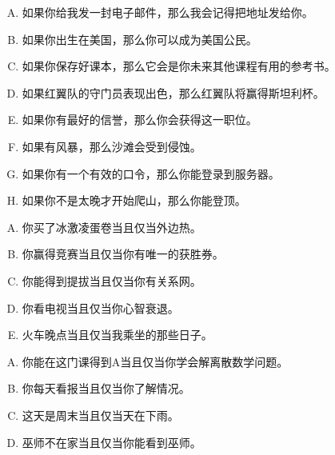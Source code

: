 {{        %
        \begin{practices}
            \begin{enumerate}[A.]
                \item 如果你给我发一封电子邮件，那么我会记得把地址发给你。
                \item 如果你出生在美国，那么你可以成为美国公民。
                \item 如果你保存好课本，那么它会是你未来其他课程有用的参考书。
                \item 如果红翼队的守门员表现出色，那么红翼队将赢得斯坦利杯。
                \item 如果你有最好的信誉，那么你会获得这一职位。
                \item 如果有风暴，那么沙滩会受到侵蚀。
                \item 如果你有一个有效的口令，那么你能登录到服务器。
                \item 如果你不是太晚才开始爬山，那么你能登顶。
            \end{enumerate}
        \end{practices}

        \begin{practices}
            \begin{enumerate}[A.]
                \item 你买了冰激凌蛋卷当且仅当外边热。
                \item 你赢得竞赛当且仅当你有唯一的获胜券。
                \item 你能得到提拔当且仅当你有关系网。
                \item 你看电视当且仅当你心智衰退。
                \item 火车晚点当且仅当我乘坐的那些日子。
            \end{enumerate}
        \end{practices}

        \begin{practices}
            \begin{enumerate}[A.]
                \item 你能在这门课得到A当且仅当你学会解离散数学问题。
                \item 你每天看报当且仅当你了解情况。
                \item 这天是周末当且仅当天在下雨。
                \item 巫师不在家当且仅当你能看到巫师。
            \end{enumerate}
        \end{practices}

}}
